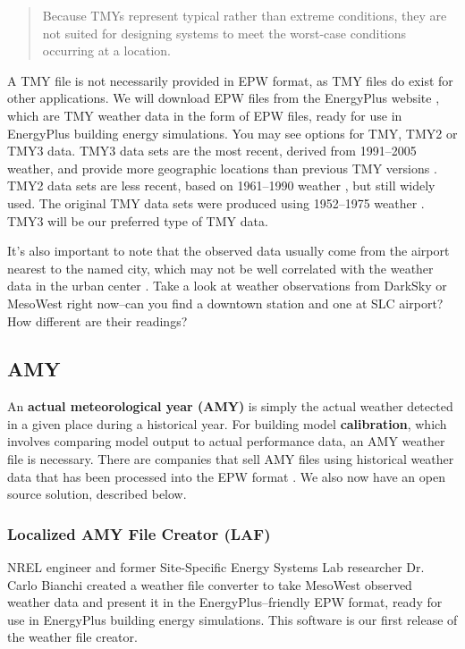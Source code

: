 \documentclass[10pt]{article}
\begin{document}
\begin{quote}
Because TMYs represent typical rather than extreme conditions, they are not suited for designing systems to meet the worst-case conditions occurring at a location. \cite{tmy-nsrdb}
\end{quote}

A TMY file is not necessarily provided in EPW format, as TMY files do exist for other applications. We will download EPW files from the EnergyPlus website \cite{EPweather}, which are TMY weather data in the form of EPW files, ready for use in EnergyPlus building energy simulations. You may see options for TMY, TMY2 or TMY3 data. TMY3 data sets are the most recent, derived from 1991--2005 weather, and provide more geographic locations than previous TMY versions \cite{TMY3user}.  TMY2 data sets are less recent, based on  1961--1990 weather \cite{TMY2user}, but still widely used.  The original TMY data sets were produced using 1952--1975 weather \cite{TMY3user}. TMY3 will be our preferred type of TMY data.

It's also important to note that the observed data usually come from the airport nearest to the named city, which may not be well correlated with the weather data in the urban center \cite{Carlo1}. Take a look at weather observations from DarkSky \cite{DarkSky} or MesoWest \cite{MesoWest} right now--can you find a downtown station and one at SLC airport? How different are their readings?

\subsection{AMY}

An \textbf{actual meteorological year (AMY)} is simply the actual weather detected in a given place during a historical year. For building model \textbf{calibration}, which involves comparing model output to actual performance data, an AMY weather file is necessary. There are companies that sell AMY files using historical weather data that has been processed into the EPW format \cite{noauthor_undated-vj}. We also now have an open source solution, described below.

\subsubsection{Localized AMY File Creator (LAF)}

NREL engineer and former Site-Specific Energy Systems Lab researcher Dr. Carlo Bianchi created a weather file converter to take MesoWest \cite{MesoWest} observed weather data and present it in the EnergyPlus--friendly EPW format, ready for use in EnergyPlus building energy simulations. This software is our first release of the weather file creator.
\end{document}
